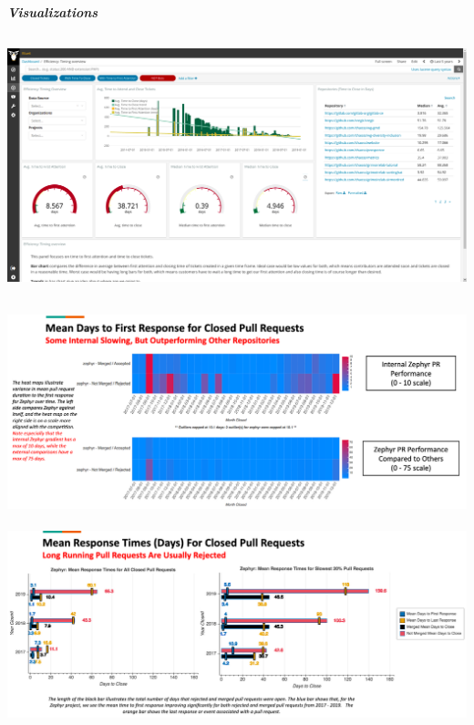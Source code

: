 \hypertarget{visualizations}{%
\subparagraph{Visualizations}\label{visualizations}}

\hypertarget{grimoirelab-panel-efficiency-timing-overview}{%
\subsection{\texorpdfstring{\protect\includegraphics{images/time-to-first-response_efficiency-timing-overview.png}}{GrimoireLab Panel: Efficiency Timing Overview}}\label{grimoirelab-panel-efficiency-timing-overview}}

\hypertarget{augur-visualization-time-to-first-response-heat-map-}{%
\subsection{\texorpdfstring{\protect\includegraphics{images/time-to-first-response_augur-ttc-1.png}}{Augur Visualization: Time to First Response Heat Map }}\label{augur-visualization-time-to-first-response-heat-map-}}

\includegraphics{images/time-to-first-response_augur-ttc-2.png}

